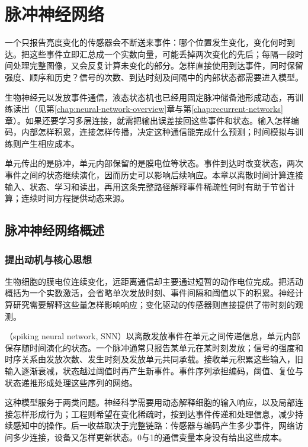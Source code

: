 \chapter{脉冲神经网络}
\label{chap:spiking-networks}

一个只报告亮度变化的传感器会不断送来事件：哪个位置发生变化，变化何时到达。把这些事件立即汇总成一个实数向量，可能丢掉两次变化的先后；每隔一段时间处理完整图像，又会反复计算未变化的部分。怎样直接使用到达事件，同时保留强度、顺序和历史？信号的次数、到达时刻及间隔中的内部状态都需要进入模型。

生物神经元以发放事件通信，液态状态机也已经用固定脉冲储备池形成动态，再训练读出（见第\ref{chap:neural-network-overview}章与第\ref{chap:recurrent-networks}章）。如果还要学习多层连接，就需把输出误差接回这些事件和状态。输入怎样编码，内部怎样积累，连接怎样传播，决定这种通信能完成什么预测；时间模拟与训练则产生相应成本。

单元传出的是脉冲，单元内部保留的是膜电位等状态。事件到达时改变状态，两次事件之间的状态继续演化，因而历史可以影响后续响应。本章以离散时间计算连接输入、状态、学习和读出，再用这条完整路径解释事件稀疏性何时有助于节省计算；连续时间方程提供动态来源。

\section{脉冲神经网络概述}
\label{sec:snn-overview}

\subsection{提出动机与核心思想}
\label{sec:snn-motivation}

生物细胞的膜电位连续变化，远距离通信却主要通过短暂的动作电位完成。把活动概括为一个实数激活，会省略单次发放时刻、事件间隔和阈值以下的积累。神经计算研究需要解释这些量怎样影响响应；变化驱动的传感器则直接提供了带时刻的观测。

（spiking neural network, SNN）以离散发放事件在单元之间传递信息，单元内部保存随时间演化的状态。一个脉冲通常只报告某单元在某时刻发放；信号的强度和时序关系由发放次数、发生时刻及发放单元共同承载。接收单元积累这些输入，旧输入逐渐衰减，状态越过阈值时再产生新事件。事件序列承担编码，阈值、复位与状态递推形成处理这些序列的网络。

这种模型服务于两类问题。神经科学需要用动态解释细胞的输入响应，以及局部连接怎样形成行为；工程则希望在变化稀疏时，按到达事件传递和处理信息，减少持续感知中的操作。后一收益取决于完整链路：传感器与编码产生多少事件，网络访问多少连接，设备又怎样更新状态。0与1的通信变量本身没有给出这些成本。

